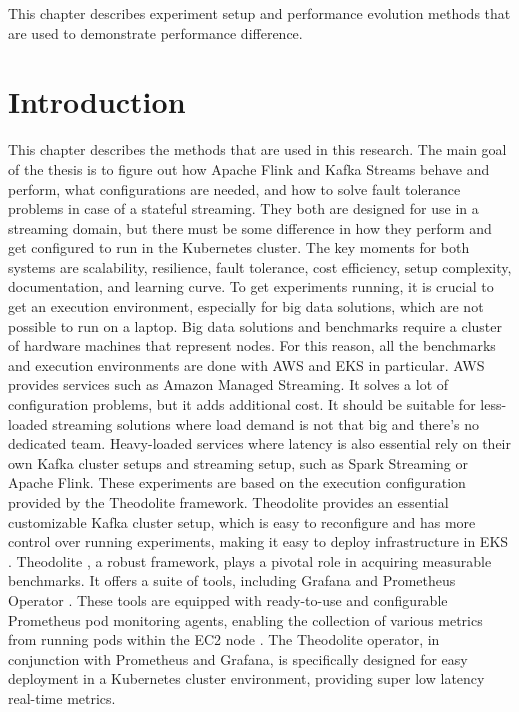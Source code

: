 This chapter describes experiment setup and performance evolution methods that are
used to demonstrate performance difference.


\section{Introduction}\label{sec:introduction}


This chapter describes the methods that are used in this research.
The main goal of the thesis is to figure out how Apache Flink and
Kafka Streams behave and perform, what configurations are needed,
and how to solve fault tolerance problems in case of a stateful streaming.
They both are designed for use in a streaming domain, but there must
be some difference in how they perform and get configured to run in the Kubernetes cluster.
The key moments for both systems are scalability, resilience, fault tolerance,
cost efficiency, setup complexity, documentation, and learning curve.
To get experiments running, it is crucial to get an execution environment,
especially for big data solutions, which are not possible to run on a laptop.
Big data solutions and benchmarks require a cluster of hardware machines that represent nodes.
For this reason, all the benchmarks and execution environments are done with AWS and EKS in particular.
AWS provides services such as Amazon Managed Streaming.
It solves a lot of configuration problems, but it adds additional cost.
It should be suitable for less-loaded streaming solutions where load demand is not that
big and there’s no dedicated team.
Heavy-loaded services where latency is also essential rely on their own Kafka cluster setups
and streaming setup, such as Spark Streaming or Apache Flink.
These experiments are based on the execution configuration provided by the Theodolite framework.
Theodolite provides an essential customizable Kafka cluster setup,
which is easy to reconfigure and has more control over running experiments,
making it easy to deploy infrastructure in EKS \cite{AWSEKS2024}.
Theodolite \cite{theodolite_framework}, a robust framework, plays a pivotal role in acquiring measurable benchmarks.
It offers a suite of tools, including Grafana \cite{Grafana2024} and Prometheus Operator \cite{PrometheusOperator2024}.
These tools are equipped with ready-to-use and configurable Prometheus \cite{Prometheus2024} pod monitoring agents,
enabling the collection of various metrics from running pods within the EC2 node \cite{aws_node_types} \cite{EC2}.
The Theodolite operator, in conjunction with Prometheus and Grafana,
is specifically designed for easy deployment in a Kubernetes cluster environment,
providing super low latency real-time metrics.

